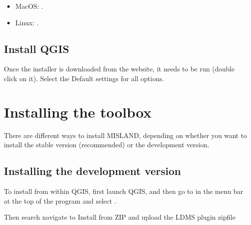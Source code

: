 \documentclass[letterpaper,10pt,english]{sphinxmanual}
\begin{document}
\begin{enumerate}
\begin{itemize}
\item {} 
\sphinxAtStartPar
MacOS: .

\item {} 
\sphinxAtStartPar
Linux: .

\end{itemize}

\end{enumerate}


\section{Install QGIS}
\label{\detokenize{Qgis_Plugin/before_installing:install-qgis}}
\sphinxAtStartPar
Once the installer is downloaded from the website, it needs to be run (double
click on it). Select the Default settings for all options.

\sphinxstepscope


\chapter{Installing the toolbox}
\label{\detokenize{Qgis_Plugin/installing:installing-the-toolbox}}\label{\detokenize{Qgis_Plugin/installing::doc}}


\sphinxAtStartPar
There are different ways to install MISLAND, depending on whether you want
to install the stable version (recommended) or the development version.


\section{Installing the development version}
\label{\detokenize{Qgis_Plugin/installing:installing-the-development-version}}
\sphinxAtStartPar
To install from within QGIS, first launch QGIS, and then go to  in the
menu bar at the top of the program and select .


\sphinxAtStartPar
Then search navigate to Install from ZIP and upload the LDMS plugin zipfile
\end{document}

